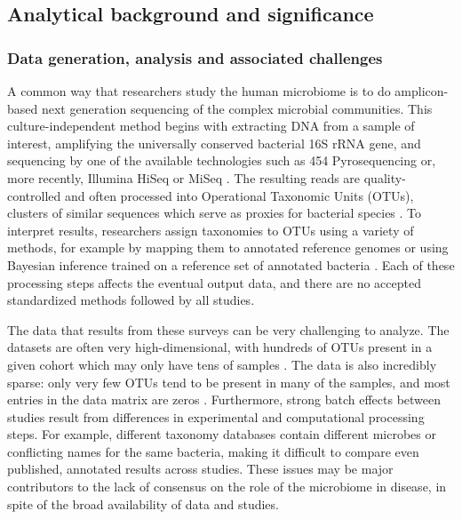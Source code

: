 \documentclass[12pt]{article}
\begin{document}
\subsection{Analytical background and significance}

\subsubsection{Data generation, analysis and associated challenges} 
A common way that researchers study the human microbiome is to do 
amplicon-based next generation sequencing of the complex microbial 
communities. This culture-independent method begins with extracting
DNA from a sample of interest, amplifying the universally conserved
bacterial 16S rRNA gene, and sequencing by one of the available technologies such as 454 
Pyrosequencing or, more recently, Illumina HiSeq or MiSeq \cite{knights-supervised-2010, sze-signal-2016}. 
The resulting reads are quality-controlled and often processed into Operational Taxonomic Units (OTUs), 
clusters of similar sequences which serve as proxies for bacterial 
species \cite{knights-supervised-2010}. To interpret results, researchers assign taxonomies to 
OTUs using a variety of methods, for example by mapping them to 
annotated reference genomes or using Bayesian inference trained on 
a reference set of annotated bacteria \cite{wang-rdp-2007, mcdonald-gg-2011}. Each of 
these processing steps affects the eventual output data, and there
are no accepted standardized methods followed by all studies.

The data that results from these surveys can be very challenging to analyze.
The datasets are often very high-dimensional, with hundreds 
of OTUs present in a given cohort which may only have tens of samples \cite{sze-signal-2016}. 
The data is also incredibly sparse: only very few OTUs tend to be 
present in many of the samples, and most entries in the data matrix 
are zeros \cite{knights-biomarkers-2011}. 
Furthermore, strong batch effects between studies result from 
differences in experimental and computational processing steps.
For example, different taxonomy databases contain different 
microbes or conflicting names for the same bacteria, making it 
difficult to compare even published, annotated results across studies.  
These issues may be major contributors to the lack of consensus on the 
role of the microbiome in disease, in spite of the broad availability of data and studies.
\end{document}
